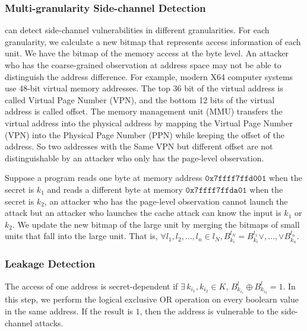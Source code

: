 \subsubsection{Multi-granularity Side-channel Detection}
\ctool{} can detect side-channel vulnerabilities in different granularities. For each granularity, we calculate a new bitmap that represents access information of each unit. We have the bitmap of the memory access at the byte level. An attacker who has the coarse-grained observation at address space may not be able to distinguish the address difference. For example, modern X64 computer systems use 48-bit virtual memory addresses. The top 36 bit of the virtual address is called Virtual Page Number (VPN), and the bottom 12 bits of the virtual address is called offset. The memory management unit (MMU) transfers the virtual address into the physical address by mapping the Virtual Page Number (VPN) into the Physical Page Number (PPN) while keeping the offset of the address. So two addresses with the Same VPN but different offset are not distinguishable by an attacker who only has the page-level observation. 

Suppose a program reads one byte at memory address
$\mathtt{0x7ffff7ffd001}$ when the secret is $k_1$ and reads a
different byte at memory $\mathtt{0x7ffff7ffda01}$ when the secret is
$k_2$, an attacker who has the page-level observation cannot launch
the attack but an attacker who launches the cache attack can know the
input is $k_1$ or $k_2$. We update the new bitmap of the large unit by
merging the bitmaps of small units that fall into the large unit. That
is, $\forall
  l_1, l_2, \dots, l_n \in l_N, B^{l_N}_{k_i} = B^{l_1}_{k_i} \lor,\dots,\lor B^{l_n}_{k_n}$.


\subsubsection{Leakage Detection} 
The access of one address is secret-dependent if $ \exists\, k_{i_1}, k_{i_2} \in K, \, B^{l}_{k_{i_1}} \oplus  B^{l}_{k_{i_2}} =1 $. In this step, we perform the logical exclusive OR operation on every boolearn value in the same address. If the result is $1$, then the address is vulnerable to the side-channel attacks.

